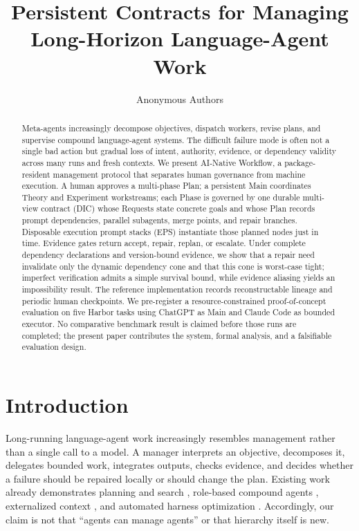 \documentclass{article}
\title{Persistent Contracts for Managing Long-Horizon Language-Agent Work}
\author{Anonymous Authors}
\begin{document}
\maketitle

\begin{abstract}
Meta-agents increasingly decompose objectives, dispatch workers, revise plans, and supervise compound language-agent systems. The difficult failure mode is often not a single bad action but gradual loss of intent, authority, evidence, or dependency validity across many runs and fresh contexts. We present AI-Native Workflow, a package-resident management protocol that separates human governance from machine execution. A human approves a multi-phase Plan; a persistent Main coordinates Theory and Experiment workstreams; each Phase is governed by one durable multi-view contract (DIC) whose Requests state concrete goals and whose Plan records prompt dependencies, parallel subagents, merge points, and repair branches. Disposable execution prompt stacks (EPS) instantiate those planned nodes just in time. Evidence gates return accept, repair, replan, or escalate. Under complete dependency declarations and version-bound evidence, we show that a repair need invalidate only the dynamic dependency cone and that this cone is worst-case tight; imperfect verification admits a simple survival bound, while evidence aliasing yields an impossibility result. The reference implementation records reconstructable lineage and periodic human checkpoints. We pre-register a resource-constrained proof-of-concept evaluation on five Harbor tasks using ChatGPT as Main and Claude Code as bounded executor. No comparative benchmark result is claimed before those runs are completed; the present paper contributes the system, formal analysis, and a falsifiable evaluation design.
\end{abstract}

\section{Introduction}
Long-running language-agent work increasingly resembles management rather than a single call to a model. A manager interprets an objective, decomposes it, delegates bounded work, integrates outputs, checks evidence, and decides whether a failure should be repaired locally or should change the plan. Existing work already demonstrates planning and search \citep{yao2023react,yao2023tot,besta2024got,prasad2024adapt,zhou2024lats}, role-based compound agents \citep{wu2023autogen,li2023camel,chen2024agentverse,hong2024metagpt}, externalized context \citep{packer2023memgpt,wang2024hiagent}, and automated harness optimization \citep{khattab2024dspy,hu2025adas}. Accordingly, our claim is not that ``agents can manage agents'' or that hierarchy itself is new.
\end{document}
